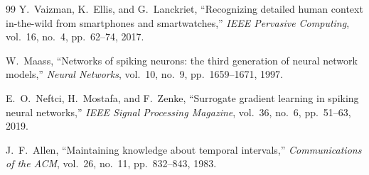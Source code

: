 \documentclass[11pt,a4paper]{article}
\begin{document}
\begin{thebibliography}{99}
Y.~Vaizman, K.~Ellis, and G.~Lanckriet, ``Recognizing detailed human context in-the-wild from smartphones and smartwatches,'' \emph{IEEE Pervasive Computing}, vol.~16, no.~4, pp.~62--74, 2017.

W.~Maass, ``Networks of spiking neurons: the third generation of neural network models,'' \emph{Neural Networks}, vol.~10, no.~9, pp.~1659--1671, 1997.

E.~O.~Neftci, H.~Mostafa, and F.~Zenke, ``Surrogate gradient learning in spiking neural networks,'' \emph{IEEE Signal Processing Magazine}, vol.~36, no.~6, pp.~51--63, 2019.

J.~F.~Allen, ``Maintaining knowledge about temporal intervals,'' \emph{Communications of the ACM}, vol.~26, no.~11, pp.~832--843, 1983.
\end{thebibliography}
\end{document}
